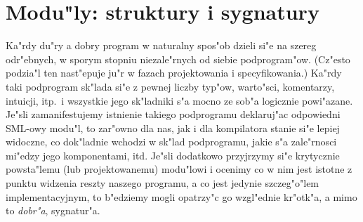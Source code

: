 \chapter{
Modu"ly: struktury i sygnatury
}

Ka"rdy du"ry a dobry program w naturalny spos"ob dzieli si"e 
na szereg odr"ebnych, w sporym stopniu niezale"rnych od siebie podprogram"ow. 
(Cz"esto podzia"l ten nast"epuje ju"r w fazach projektowania i specyfikowania.)
Ka"rdy taki podprogram sk"lada si"e z pewnej liczby typ"ow, 
warto"sci, komentarzy, intuicji, itp.\ i wszystkie jego sk"ladniki s"a mocno ze sob"a logicznie powi"azane.
Je"sli zamanifestujemy istnienie takiego podprogramu deklaruj"ac odpowiedni SML-owy modu"l, 
to zar"owno dla nas, jak i dla kompilatora stanie si"e lepiej widoczne, 
co dok"ladnie wchodzi w sk"lad podprogramu, jakie s"a zale"rnosci mi"edzy jego komponentami, itd.
Je"sli dodatkowo przyjrzymy si"e krytycznie powsta"lemu (lub projektowanemu)
modu"lowi i ocenimy co w nim jest istotne z punktu widzenia reszty naszego programu, 
a co jest jedynie szczeg"o"lem implementacyjnym, 
to b"edziemy mogli opatrzy"c go wzgl"ednie kr"otk"a, a mimo to \emph{dobr"a}, sygnatur"a. 

